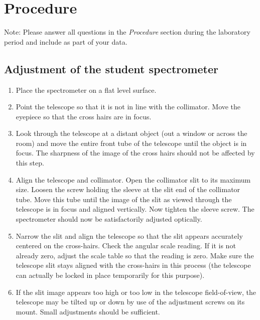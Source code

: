 \section{Procedure}

Note: Please answer all questions in the \textit{Procedure} section during the
laboratory period and include as part of your data.

\subsection{Adjustment of the student spectrometer}
\begin{enumerate}

\item Place the spectrometer on a flat level surface.

\item Point the telescope so that it is not in line with the collimator.  Move
  the eyepiece so that the cross hairs are in focus.

\item Look through the telescope at a distant object (out a window or across the
  room) and move the entire front tube of the telescope until the object is in
  focus. The sharpness of the image of the cross hairs should not be affected by
  this step.

\item Align the telescope and collimator. Open the collimator slit to its
  maximum size. Loosen the screw holding the sleeve at the slit end of the
  collimator tube. Move this tube until the image of the slit as viewed through
  the telescope is in focus and aligned vertically. Now tighten the
  sleeve screw. The spectrometer should now be satisfactorily adjusted
  optically.

\item Narrow the slit and align the telescope so that the slit appears
  accurately centered on the cross-hairs.  Check the angular scale reading.  If
  it is not already zero, adjust the scale table so that the reading is zero.
  Make sure the telescope slit stays aligned with the cross-hairs in this
  process (the telescope can actually be locked in place temporarily for this
  purpose).

\item If the slit image appears too high or too low in the telescope
  field-of-view, the telescope may be tilted up or down by use of the adjustment
  screws on its mount.  Small adjustments should be sufficient.

\end{enumerate}


